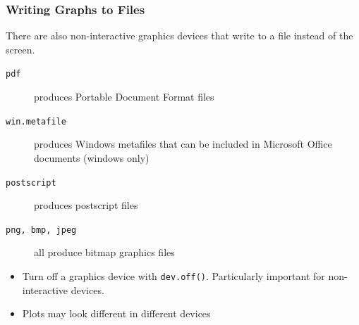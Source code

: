 \documentclass[xcolor=svgnames]{beamer}
\newcommand{\code}[1]{\texttt{#1}}
\begin{document}
\begin{frame}
  \frametitle{Writing Graphs to Files}
  
  There are also non-interactive graphics devices that write 
  to a file instead of the screen.
  \begin{description}
  \item[\code{pdf}] produces Portable Document Format files
  \item[\code{win.metafile}] produces Windows metafiles that can be included in      
  Microsoft Office documents (windows only)
  \item[\code{postscript}] produces postscript files
  \item[\code{png, bmp, jpeg}] all produce bitmap graphics files
  \end{description}
  \begin{itemize}
  \item Turn off a graphics device with \code{dev.off()}. Particularly
    important for non-interactive devices.
  \item Plots may look different in different devices
  \end{itemize}
\end{frame}




\end{document}
